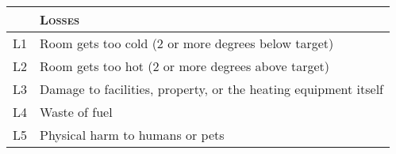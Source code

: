 \begin{tabular}{|p{.5cm}|p{8.5cm}|}
\hline
&\textsc{Losses}\\
\hline
L1 & Room gets too cold (2 or more degrees below target)\\
\hline
L2 & Room gets too hot (2 or more degrees above target)\\
\hline
L3 & Damage to facilities, property, or the heating equipment itself\\
\hline
L4 & Waste of fuel\\
\hline
L5 & Physical harm to humans or pets\\
\hline
\end{tabular}
\vspace{1em}
